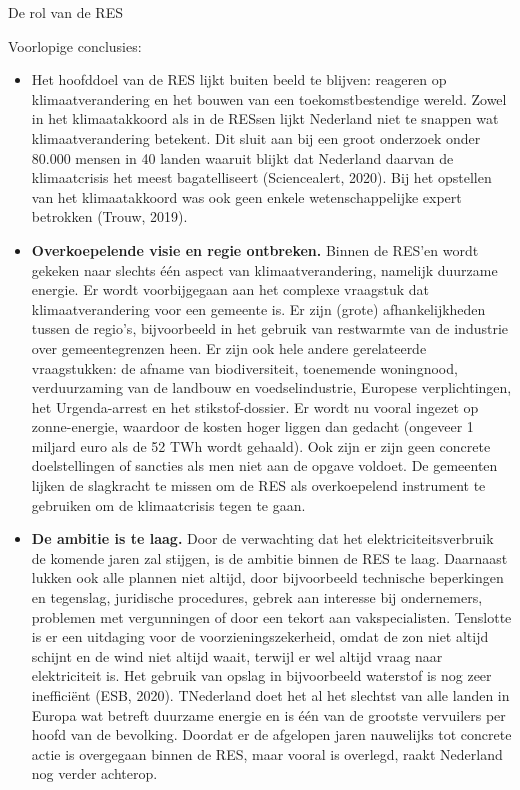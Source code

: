 \begin{voorstel}{De rol van de RES}
\begin{overwegingen}
Voorlopige conclusies:
\begin{itemize}
	\item Het hoofddoel van de RES lijkt buiten beeld te blijven: reageren op klimaatverandering en het bouwen van een toekomstbestendige wereld. Zowel in het klimaatakkoord als in de RESsen lijkt Nederland niet te snappen wat klimaatverandering betekent. Dit sluit aan bij een groot onderzoek onder 80.000 mensen in 40 landen waaruit blijkt dat Nederland daarvan de klimaatcrisis het meest bagatelliseert (Sciencealert, 2020). Bij het opstellen van het klimaatakkoord was ook geen enkele wetenschappelijke expert betrokken (Trouw, 2019).
	\item \textbf{Overkoepelende visie en regie ontbreken.} Binnen de RES’en wordt gekeken naar slechts één aspect van klimaatverandering, namelijk duurzame energie. Er wordt voorbijgegaan aan het complexe vraagstuk dat klimaatverandering voor een gemeente is. Er zijn (grote) afhankelijkheden tussen de regio’s, bijvoorbeeld in het gebruik van restwarmte van de industrie over gemeentegrenzen heen. Er zijn ook hele andere gerelateerde vraagstukken: de afname van biodiversiteit, toenemende woningnood, verduurzaming van de landbouw en voedselindustrie, Europese verplichtingen, het Urgenda-arrest en het stikstof-dossier. Er wordt nu vooral ingezet op zonne-energie, waardoor de kosten hoger liggen dan gedacht (ongeveer 1 miljard euro als de 52 TWh wordt gehaald). Ook zijn er zijn geen concrete doelstellingen of sancties als men niet aan de opgave voldoet. De gemeenten lijken de slagkracht te missen om de RES als overkoepelend instrument te gebruiken om de klimaatcrisis tegen te gaan.
	\item \textbf{De ambitie is te laag.} Door de verwachting dat het elektriciteitsverbruik de komende jaren zal stijgen, is de ambitie binnen de RES te laag. Daarnaast lukken ook alle plannen niet altijd, door bijvoorbeeld technische beperkingen en tegenslag, juridische procedures, gebrek aan interesse bij ondernemers, problemen met vergunningen of door een tekort aan vakspecialisten. Tenslotte is er een uitdaging voor de voorzieningszekerheid, omdat de zon niet altijd schijnt en de wind niet altijd waait, terwijl er wel altijd vraag naar elektriciteit is. Het gebruik van opslag in bijvoorbeeld waterstof is nog zeer inefficiënt (ESB, 2020). TNederland doet het al het slechtst van alle landen in Europa wat betreft duurzame energie en is één van de grootste vervuilers per hoofd van de bevolking. Doordat er de afgelopen jaren nauwelijks tot concrete actie is overgegaan binnen de RES, maar vooral is overlegd, raakt Nederland nog verder achterop.

\end{itemize}
\end{overwegingen}
\end{voorstel}
